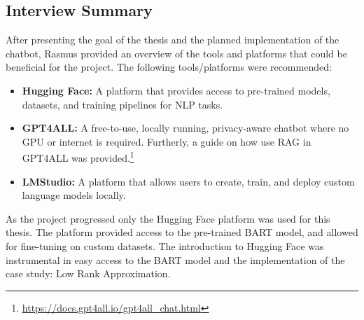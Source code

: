     \subsection*{Interview Summary}
        After presenting the goal of the thesis and the planned implementation of the chatbot, Rasmus provided an overview of the tools and platforms that could be beneficial for the project. The following tools/platforms were recommended:
        \begin{itemize}
            \item \textbf{Hugging Face:} A platform that provides access to pre-trained models, datasets, and training pipelines for NLP tasks.
            \item \textbf{GPT4ALL:} A free-to-use, locally running, privacy-aware chatbot where no GPU or internet is required. Furtherly, a guide on how use RAG in GPT4ALL was provided.\footnote{\url{https://docs.gpt4all.io/gpt4all_chat.html}}
            \item \textbf{LMStudio:} A platform that allows users to create, train, and deploy custom language models locally.
        \end{itemize}
        As the project progressed only the Hugging Face platform was used for this thesis. The platform provided access to the pre-trained BART model, and allowed for fine-tuning on custom datasets. The introduction to Hugging Face was instrumental in easy access to the BART model and the implementation of the case study: Low Rank Approximation.